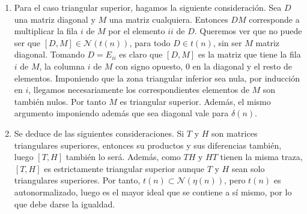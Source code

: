 \documentclass[twoside]{article}
\begin{document}
\begin{solucion}
\begin{enumerate}
\item 
Para el caso triangular superior, hagamos la siguiente consideración. Sea $D$ una matriz diagonal y $M$ una matriz cualquiera. Entonces $DM$ corresponde a multiplicar la fila $i$ de $M$ por el elemento $ii$ de $D$. Queremos ver que no puede ser que $[D,M] \in \mathcal{N}(t(n))$, para todo $D\in t(n)$, sin ser $M$ matriz diagonal. Tomando $D=E_{ii}$ es claro que $[D,M]$ es la matriz que tiene la fila $i$ de $M$, la columna $i$ de $M$ con signo opuesto, $0$ en la diagonal y el resto de elementos. Imponiendo que la zona triangular inferior sea nula, por inducción en $i$, llegamos  necesariamente los correspondientes elementos de $M$ son también nulos. Por tanto $M$ es triangular superior. Además, el mismo argumento imponiendo además que sea diagonal vale para $\delta(n)$.

\item Se deduce de las siguientes consideraciones. Si $T$ y $H$ son matrices triangulares superiores, entonces su productos y sus diferencias también, luego $[T,H]$ también lo será. Además, como $TH$ y $HT$ tienen la misma traza, $[T,H]$ es estrictamente triangular superior aunque $T$ y $H$ sean solo triangulares superiores. Por tanto, $t(n) \subset \mathcal{N}(\eta(n))$, pero $t(n)$ es autonormalizado, luego es el mayor ideal que se contiene a sí mismo, por lo que debe darse la igualdad. 
\end{enumerate}
\end{solucion}
\end{document}
